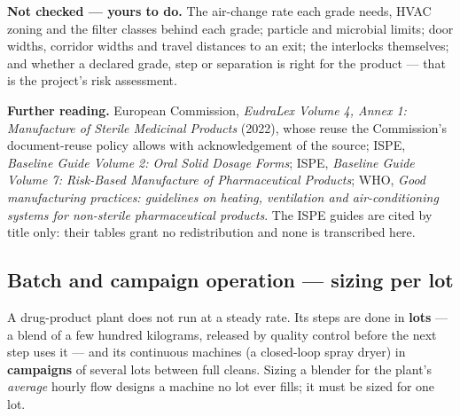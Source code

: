 \documentclass[11pt,a4paper]{article}
\begin{document}
\textbf{Not checked --- yours to do.} The air-change rate each grade
needs, HVAC zoning and
the filter classes behind each grade; particle and microbial limits;
door widths, corridor widths and travel distances to an exit; the
interlocks themselves; and whether a declared grade, step or separation
is right for the product --- that is the project's risk assessment.

\textbf{Further reading.} European Commission, \emph{EudraLex Volume 4,
Annex 1: Manufacture of Sterile Medicinal Products} (2022), whose
reuse the Commission's document-reuse policy allows with acknowledgement
of the source; ISPE, \emph{Baseline Guide Volume 2: Oral Solid Dosage
Forms}; ISPE, \emph{Baseline Guide Volume 7: Risk-Based Manufacture of
Pharmaceutical Products}; WHO, \emph{Good manufacturing practices:
guidelines on heating, ventilation and air-conditioning systems for
non-sterile pharmaceutical products}. The ISPE guides are cited by title
only: their tables grant no redistribution and none is transcribed here.

\hypertarget{batch-and-campaign-operation}{%
\subsection{Batch and campaign operation --- sizing per
lot}\label{batch-and-campaign-operation}}

A drug-product plant does not run at a steady rate. Its steps are done
in \textbf{lots} --- a blend of a few hundred kilograms, released by
quality control before the next step uses it --- and its continuous
machines (a closed-loop spray dryer) in \textbf{campaigns} of several
lots between full cleans. Sizing a blender for the plant's
\emph{average} hourly flow designs a machine no lot ever fills; it must
be sized for one lot.
\end{document}
